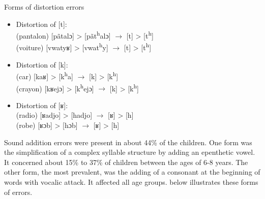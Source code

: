 \documentclass[output=paper,newtxmath,modfonts,nonflat,draftmode]{langsci/langscibook}
\begin{document}
\begin{exe}
\ex Forms of distortion errors \label{ex:takam:distortion_errors}
\begin{itemize}
\item Distortion of [t]:\\
(pantalon) [pãtalɔ] > [pãt\textsuperscript{h}alɔ] $\rightarrow$ [t] > [t\textsuperscript{h}]\\
(voiture) [vwatyʁ] > [vwat\textsuperscript{h}y] $\rightarrow$ [t] > [t\textsuperscript{h}]\\

\item Distortion of [k]:\\ 
(car) [kaʁ] > [k\textsuperscript{h}a] $\rightarrow$ [k] > [k\textsuperscript{h}]\\
(crayon) [kʁejɔ] > [k\textsuperscript{h}ejɔ] $\rightarrow$ [k] > [k\textsuperscript{h}]\\
\item Distortion of [ʁ]:\\
(radio) [ʁadjo] > [hadjo] $\rightarrow$ [ʁ] > [h]\\
(robe) [ʁɔb] > [hɔb] $\rightarrow$ [ʁ] > [h] \\
\end{itemize}
\end{exe}



Sound addition errors were present in about 44\% of the children. One form was the simplification of a complex syllable structure by adding an epenthetic vowel. It concerned about 15\% to 37\% of children between the ages of 6-8 years. The other form, the most prevalent, was the adding of a consonant at the beginning of words with vocalic attack. It affected all age groups.  below illustrates these forms of errors.
\end{document}
